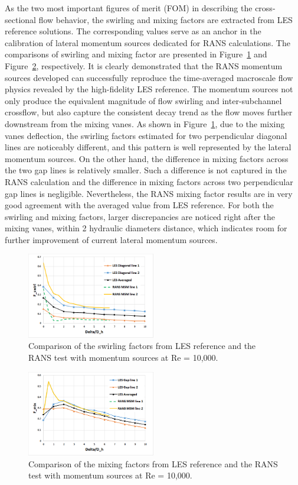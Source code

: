 As the two most important figures of merit (FOM) in describing the cross-sectional flow behavior, the swirling and mixing factors are extracted from LES reference solutions.
The corresponding values serve as an anchor in the calibration of lateral momentum sources dedicated for RANS calculations.
The comparisons of swirling and mixing factor are presented in Figure~\ref{fig:fswirl} and Figure~\ref{fig:fmix}, respectively.
It is clearly demonstrated that the RANS momentum sources developed can successfully reproduce the time-averaged macroscale flow physics revealed by the high-fidelity LES reference.
The momentum sources not only produce the equivalent magnitude of flow swirling and inter-subchannel crossflow, but also capture the consistent decay trend as the flow moves further downstream from the mixing vanes.
As shown in Figure~\ref{fig:fswirl}, due to the mixing vanes deflection, the swirling factors estimated for two perpendicular diagonal lines are noticeably different, and this pattern is well represented by the lateral momentum sources.
On the other hand, the difference in mixing factors across the two gap lines is relatively smaller. Such a difference is not captured in the RANS calculation and the difference in mixing factors across two perpendicular gap lines is negligible.
Nevertheless, the RANS mixing factor results are in very good agreement with the averaged value from LES reference. For both the swirling and mixing factors, larger discrepancies are noticed right after the mixing vanes, within 2 hydraulic diameters distance, which indicates room for further improvement of current lateral momentum sources.

\begin{figure}[!ht]
\centering
\includegraphics[width=0.5\textwidth]{./figures/Results_swirling_factor.png}
\caption{Comparison of the swirling factors from LES reference and the RANS test with momentum sources at Re = 10,000. }
\label{fig:fswirl}
\end{figure}

\begin{figure}[!ht]
\centering
\includegraphics[width=0.5\textwidth]{./figures/Results_mixing_factor.png}
\caption{Comparison of the mixing factors from LES reference and the RANS test with momentum sources at Re = 10,000. }
\label{fig:fmix}
\end{figure}

